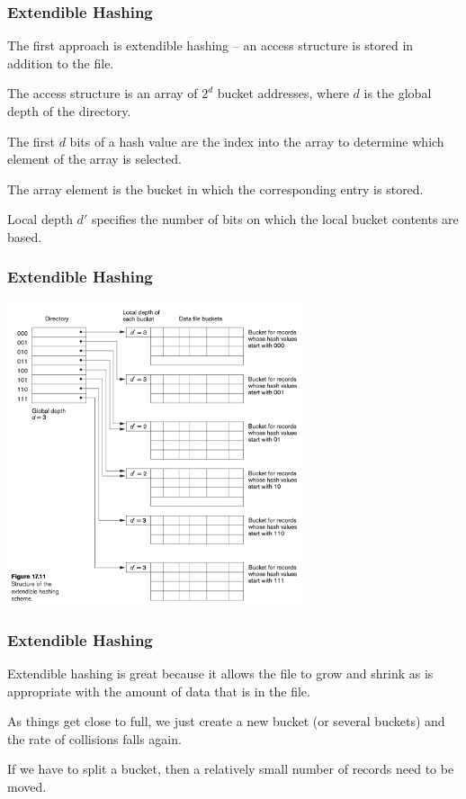 \begin{frame}
\frametitle{Extendible Hashing}

The first approach is \alert{extendible hashing} -- an access structure is stored in addition to the file. 

The access structure is an array of $2^{d}$ bucket addresses, where $d$ is the global depth of the directory.

The first $d$ bits of a hash value are the index into the array to determine which element of the array is selected. 

The array element is the bucket in which the corresponding entry is stored. 

Local depth $d'$ specifies the number of bits on which the local bucket contents are based.

\end{frame}

\begin{frame}
\frametitle{Extendible Hashing}

\begin{center}
	\includegraphics[width=0.65\textwidth]{images/extendible-hashing}
\end{center}

\end{frame}


\begin{frame}
\frametitle{Extendible Hashing}

Extendible hashing is great because it allows the file to grow and shrink as is appropriate with the amount of data that is in the file. 

As things get close to full, we just create a new bucket (or several buckets) and the rate of collisions falls again. 

If we have to split a bucket, then a relatively small number of records need to be moved. 


\end{frame}



